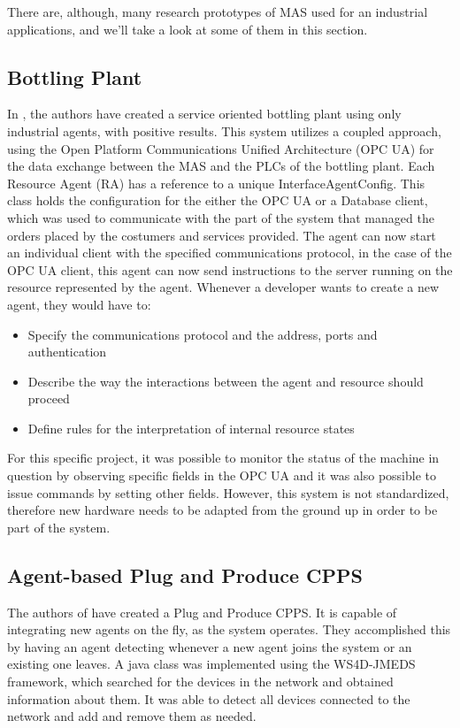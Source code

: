There are, although, many research prototypes of MAS used for an industrial applications, and we'll take a look at some of them in this section.

\subsection{Bottling Plant}

In \cite{marschall01}, the authors have created a service oriented bottling plant using only industrial agents, with positive results. This system utilizes a coupled approach, using the Open Platform Communications Unified Architecture (OPC UA) for the data exchange between the MAS and the PLCs of the bottling plant. Each Resource Agent (RA) has a reference to a unique InterfaceAgentConfig. This class holds the configuration for the either the OPC UA or a Database client, which was used to communicate with the part of the system that managed the orders placed by the costumers and services provided. The agent can now start an individual client with the specified communications protocol, in the case of the OPC UA client, this agent can now send instructions to the server running on the resource represented by the agent.
Whenever a developer wants to create a new agent, they would have to:
\begin{itemize}
	\item Specify the communications protocol and the address, ports and authentication
	\item Describe the way the interactions between the agent and resource should proceed
	\item Define rules for the interpretation of internal resource states
\end{itemize}

For this specific project, it was possible to monitor the status of the machine in question by observing specific fields in the OPC UA and it was also possible to issue commands by setting other fields. However, this system is not standardized, therefore new hardware needs to be adapted from the ground up in order to be part of the system.
 
\subsection{Agent-based Plug and Produce CPPS}

The authors of \cite{8972169} have created a Plug and Produce CPPS. It is capable of integrating new agents on the fly, as the system operates. They accomplished this by having an agent detecting whenever a new agent joins the system or an existing one leaves. A java class was implemented using the WS4D-JMEDS framework, which searched for the devices in the network and obtained information about them. It was able to detect all devices connected to the network and add and remove them as needed.

